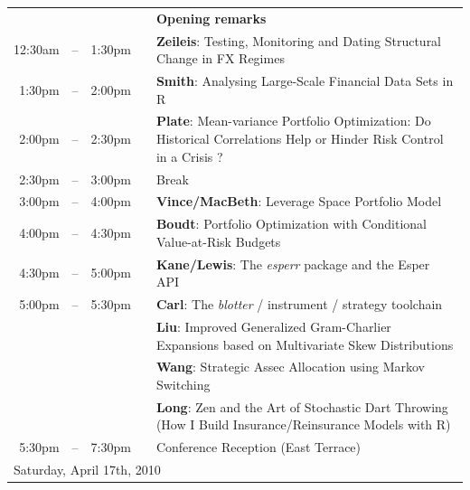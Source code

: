 \documentclass[11pt]{article}
\newcommand{\mylinecolor}[1]{\color{#1}\vspace{-8pt}}  %
\begin{document}
\begin{tabular}{rlrlp{5in}}
  \phantom{X 12:30pm}  & \phantom{m} &  & & \textbf{\color{Breaks} Opening remarks} \\
  12:30am& -- & 1:30pm &    & \textbf{\color{KeynoteTalk} Zeileis}: \small{Testing, Monitoring and Dating Structural Change in FX Regimes} \\
  1:30pm & -- & 2:00pm &    & \textbf{\color{Talk} Smith}: \small{Analysing Large-Scale Financial Data Sets in R} \\
  2:00pm & -- & 2:30pm &    & \textbf{\color{Talk} Plate}: \small{Mean-variance Portfolio Optimization: Do Historical Correlations Help or Hinder Risk Control in a Crisis ?} \\[0pt]
  2:30pm & -- & 3:00pm &    & \small{\mylinecolor{Breaks} Break} \\
  3:00pm & -- & 4:00pm &    & \textbf{\color{KeynoteTalk} Vince/MacBeth}: \small{Leverage Space Portfolio Model} \\
  4:00pm & -- & 4:30pm &    & \textbf{\color{Talk} Boudt}: \small{Portfolio Optimization with Conditional Value-at-Risk Budgets} \\
  4:30pm & -- & 5:00pm &    & \textbf{\color{Talk} Kane/Lewis}: \small{The \emph{esperr} package and the Esper API} \\
  5:00pm & -- & 5:30pm &    & \textbf{\color{LightningTalk} Carl}: \small{The \emph{blotter} / instrument / strategy toolchain} \\
         &    &        &    & \textbf{\color{LightningTalk} Liu}: \small{Improved Generalized Gram-Charlier Expansions based on Multivariate Skew Distributions} \\
         &    &        &    & \textbf{\color{LightningTalk} Wang}: \small{Strategic Assec Allocation using Markov Switching} \\
         &    &        &    & \textbf{\color{LightningTalk} Long}: \small{Zen and the Art of Stochastic Dart Throwing (How I Build Insurance/Reinsurance Models with R)} \\[0pt]
  5:30pm & -- & 7:30pm &    & \small{\mylinecolor{Breaks} Conference Reception (East Terrace)}  \\[18pt]

  \multicolumn{5}{l}{\Large Saturday, April 17th, 2010} \\


\end{tabular}
\end{document}
